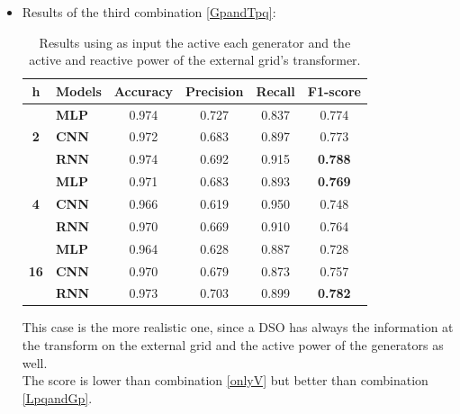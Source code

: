 \begin{itemize}
    
    \item Results of the third combination \ref{GpandTpq}:
    
    \begin{table}[h]
    \centering
    \begin{tabular}{|c|l|c|c|c|c|}
    \hline
    \textbf{h} &
      \textbf{Models} &
      \multicolumn{1}{l|}{\textbf{Accuracy}} &
      \multicolumn{1}{l|}{\textbf{Precision}} &
      \multicolumn{1}{l|}{\textbf{Recall}} &
      \multicolumn{1}{l|}{\textbf{F1-score}} \\ \hline
    \multirow{3}{*}{\textbf{2}}  & \textbf{MLP} & 0.974 & 0.727 & 0.837 & 0.774          \\ \cline{2-6} 
                                 & \textbf{CNN} & 0.972 & 0.683 & 0.897 & 0.773          \\ \cline{2-6} 
                                 & \textbf{RNN} & 0.974 & 0.692 & 0.915 & \textbf{0.788} \\ \hline
    \multirow{3}{*}{\textbf{4}}  & \textbf{MLP} & 0.971 & 0.683 & 0.893 & \textbf{0.769} \\ \cline{2-6} 
                                 & \textbf{CNN} & 0.966 & 0.619 & 0.950 & 0.748          \\ \cline{2-6} 
                                 & \textbf{RNN} & 0.970 & 0.669 & 0.910 & 0.764          \\ \hline
    \multirow{3}{*}{\textbf{16}} & \textbf{MLP} & 0.964 & 0.628 & 0.887 & 0.728          \\ \cline{2-6} 
                                 & \textbf{CNN} & 0.970 & 0.679 & 0.873 & 0.757          \\ \cline{2-6} 
                                 & \textbf{RNN} & 0.973 & 0.703 & 0.899 & \textbf{0.782} \\ \hline
    \end{tabular}
    \caption[Models' results using generators and the external grid information]{Results using as input the active each generator and the active and reactive power of the external grid's transformer.}
    \end{table}
    This case is the more realistic one, since a \gls{DSO} has always the information at the transform on the external grid and the active power of the generators as well.\\
    The score is lower than combination \ref{onlyV} but better than combination \ref{LpqandGp}.\\
    

\end{itemize}
